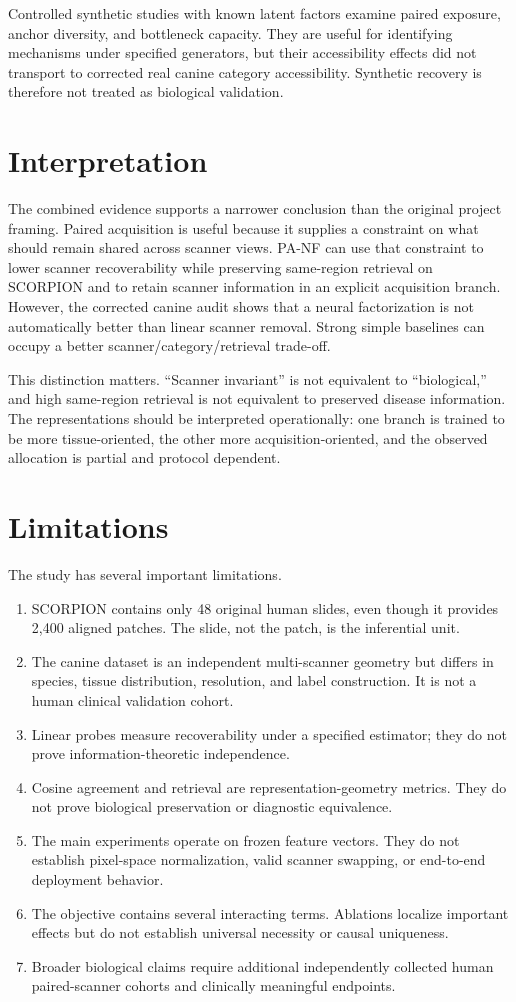 Controlled synthetic studies with known latent factors examine paired exposure, anchor diversity, and bottleneck capacity. They are useful for identifying mechanisms under specified generators, but their accessibility effects did not transport to corrected real canine category accessibility. Synthetic recovery is therefore not treated as biological validation.

\section{Interpretation}
The combined evidence supports a narrower conclusion than the original project framing. Paired acquisition is useful because it supplies a constraint on what should remain shared across scanner views. PA-NF can use that constraint to lower scanner recoverability while preserving same-region retrieval on SCORPION and to retain scanner information in an explicit acquisition branch. However, the corrected canine audit shows that a neural factorization is not automatically better than linear scanner removal. Strong simple baselines can occupy a better scanner/category/retrieval trade-off.

This distinction matters. ``Scanner invariant'' is not equivalent to ``biological,'' and high same-region retrieval is not equivalent to preserved disease information. The representations should be interpreted operationally: one branch is trained to be more tissue-oriented, the other more acquisition-oriented, and the observed allocation is partial and protocol dependent.

\section{Limitations}
The study has several important limitations.
\begin{enumerate}
  \item SCORPION contains only 48 original human slides, even though it provides 2,400 aligned patches. The slide, not the patch, is the inferential unit.
  \item The canine dataset is an independent multi-scanner geometry but differs in species, tissue distribution, resolution, and label construction. It is not a human clinical validation cohort.
  \item Linear probes measure recoverability under a specified estimator; they do not prove information-theoretic independence.
  \item Cosine agreement and retrieval are representation-geometry metrics. They do not prove biological preservation or diagnostic equivalence.
  \item The main experiments operate on frozen feature vectors. They do not establish pixel-space normalization, valid scanner swapping, or end-to-end deployment behavior.
  \item The objective contains several interacting terms. Ablations localize important effects but do not establish universal necessity or causal uniqueness.
  \item Broader biological claims require additional independently collected human paired-scanner cohorts and clinically meaningful endpoints.
\end{enumerate}

